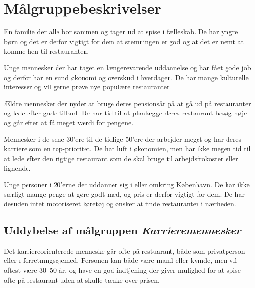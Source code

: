 \documentclass[a4paper, 12pt]{article}
\begin{document}
\section{Målgruppebeskrivelser}
\label{sec:Maalgruppebeskrivelser}

\begin{description}[style=nextline,font=\bf]
  \item[Familier med små børn]

    En familie der alle bor sammen og tager ud at spise i
    fælleskab. De har yngre børn og det er derfor vigtigt for dem at
    stemningen er god og at det er nemt at komme hen til restauranten.

  \item[25--30 årige storby-par uden børn]

    Unge mennesker der har taget en længerevarende uddannelse og har
    fået gode job og derfor har en sund økonomi og overskud i
    hverdagen. De har mange kulturelle interesser og vil gerne prøve
    nye populære restauranter.

  \item[Pensionister]

    Ældre mennesker der nyder at bruge deres pensionsår på at gå ud på
    restauranter og lede efter gode tilbud. De har tid til at
    planlægge deres restaurant-besøg nøje og går efter at få meget
    værdi for pengene.

  \item[Karrieremennesker]

    Mennesker i de sene 30'ere til de tidlige 50'ere der arbejder
    meget og har deres karriere som en top-prioritet. De har luft i
    økonomien, men har ikke megen tid til at lede efter den rigtige
    restaurant som de skal bruge til arbejdsfrokoster eller lignende.

  \item[Studerende]

    Unge personer i 20'erne der uddanner sig i eller omkring
    København. De har ikke særligt mange penge at gøre godt med, og
    pris er derfor vigtigt for dem. De har desuden intet motoriseret
    køretøj og ønsker at finde restauranter i nærheden.
\end{description}

\subsection{Uddybelse af målgruppen \emph{Karrieremennesker}}
Det karriereorienterede menneske går ofte på restuarant, både som privatperson eller i forretningsøjemed. Personen kan både være mand eller kvinde, men vil oftest være 30--50 år, og have en god indtjening der giver mulighed for at spise ofte på restaurant uden at skulle tænke over prisen.
\end{document}

